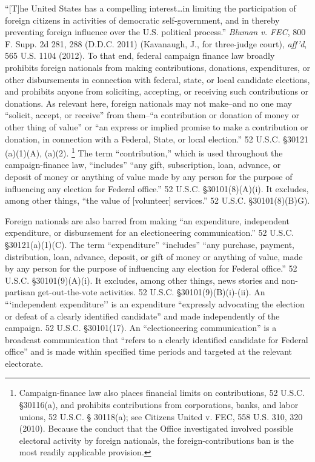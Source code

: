 ``[T]he United States has a compelling interest\dots in limiting the participation of foreign citizens in activities of democratic self-government, and in thereby preventing foreign influence over the U.S. political process.''
\textit{Bluman v. FEC}, 800 F. Supp. 2d 281, 288 (D.D.C. 2011) (Kavanaugh, J., for three-judge court), \textit{aff'd}, 565 U.S. 1104 (2012).
To that end, federal campaign finance law broadly prohibits foreign nationals from making contributions, donations, expenditures, or other disbursements in connection with federal, state, or local candidate elections, and prohibits anyone from soliciting, accepting, or receiving such contributions or donations.
As relevant here, foreign nationals may not make--and no one may ``solicit, accept, or receive'' from them--``a contribution or donation of money or other thing of value'' or ``an express or implied promise to make a contribution or donation, in connection with a Federal, State, or local election.''
52 U.S.C. \S 30121 (a)(1)(A), (a)(2).%
\footnote{Campaign-finance law also places financial limits on contributions, 52 U.S.C. \S 30116(a), and prohibits contributions from corporations, banks, and labor unions, 52 U.S.C. § 30118(a);
see Citizens United v. FEC, 558 U.S. 310, 320 (2010).
Because the conduct that the Office investigated involved possible electoral activity by foreign nationals, the foreign-contributions ban is the most readily applicable provision.}
The term ``contribution,'' which is used throughout the campaign-finance law, ``includes'' ``any gift, subscription, loan, advance, or deposit of money or anything of value made by any person for the purpose of influencing any election for Federal office.''
52 U.S.C. \S 30101(8)(A)(i).
It excludes, among other things, ``the value of [volunteer] services.'' 52 U.S.C. \S 30101(8)(B)G).

Foreign nationals are also barred from making ``an expenditure, independent expenditure, or disbursement for an electioneering communication.''
52 U.S.C. \S 30121(a)(1)(C).
The term ``expenditure'' ``includes'' ``any purchase, payment, distribution, loan, advance, deposit, or gift of money or anything of value, made by any person for the purpose of influencing any election for Federal office.''
52 U.S.C. \S 30101(9)(A)(i).
It excludes, among other things, news stories and non-partisan get-out-the-vote activities.
52 U.S.C. \S 30101(9)(B)(i)-(ii).
An ```independent expenditure'' is an expenditure ``expressly advocating the election or defeat of a clearly identified candidate'' and made independently of the campaign.
52 U.S.C. \S 30101(17).
An ``electioneering communication'' is a broadcast communication that ``refers to a clearly identified candidate for Federal office'' and is made within specified time periods and targeted at the relevant electorate.

